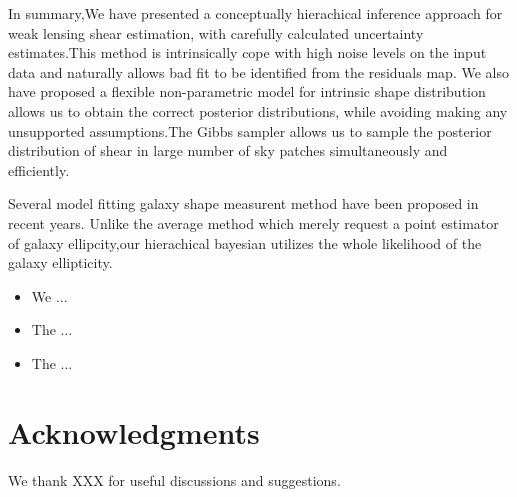 \documentclass[useAMS,usenatbib]{mn2e}
\begin{document}
\label{sec:conclusions}

In summary,We have presented a conceptually hierachical inference
approach for weak lensing shear estimation, with carefully calculated 
uncertainty estimates.This method is intrinsically cope with high noise
levels on the input data and naturally allows bad fit to be identified 
from the residuals map. We also have proposed a flexible non-parametric model 
for intrinsic shape distribution allows us to obtain the correct posterior 
distributions, while avoiding making any unsupported assumptions.The Gibbs
sampler allows us to sample the posterior distribution of shear in large number of
sky patches simultaneously and efficiently.

Several  model fitting galaxy shape measurent method have been proposed in recent years.
Unlike the average method which merely request a point estimator of galaxy ellipcity,our hierachical bayesian
utilizes the whole likelihood of the galaxy ellipticity.
\begin{itemize}
\item We ...
\item The ...
\item The ...
\end{itemize}



\section*{Acknowledgments}

We thank XXX for useful discussions and suggestions.



% 
% 
% 
% 






 





\label{lastpage} \bsp
\end{document}
